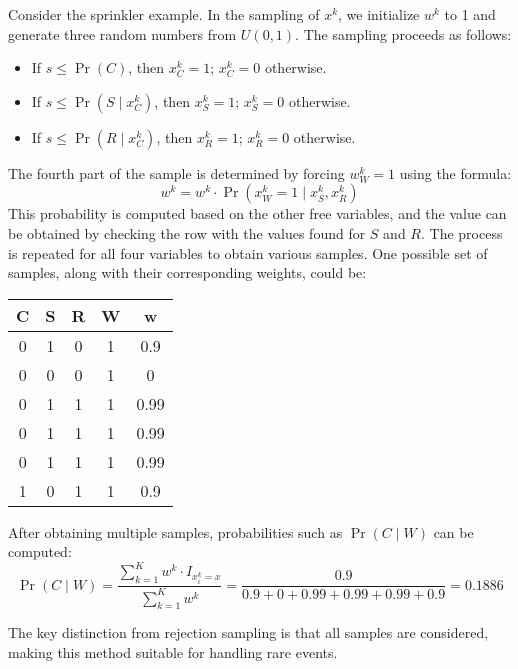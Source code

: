 \begin{example}
    Consider the sprinkler example. 
    In the sampling of $x^k$, we initialize $w^k$ to 1 and generate three random numbers from $U(0,1)$. 
    The sampling proceeds as follows:
    \begin{itemize}
        \item If $ s \leq \Pr(C)$, then $x_C^k=1$; $x_C^k=0$ otherwise. 
        \item If $ s \leq \Pr(S\mid x_C^k)$, then $x_S^k=1$; $x_S^k=0$ otherwise. 
        \item If $ s \leq \Pr(R\mid x_C^k)$, then $x_R^k=1$; $x_R^k=0$ otherwise. 
    \end{itemize}
    The fourth part of the sample is determined by forcing $w^k_W=1$ using the formula: 
    \[w^k=w^k\cdot\Pr\left( x_W^k=1\mid x_S^k,x_R^k \right)\]
    This probability is computed based on the other free variables, and the value can be obtained by checking the row with the values found for $S$ and $R$.
    The process is repeated for all four variables to obtain various samples. 
    One possible set of samples, along with their corresponding weights, could be:
    \begin{table}[H]
        \centering
        \begin{tabular}{ccccc}
        \hline
        \textbf{C} & \textbf{S} & \textbf{R} & \textbf{W} & \textbf{w}  \\ \hline
        0          & 1          & 0          & 1          & 0.9         \\
        0          & 0          & 0          & 1          & 0           \\
        0          & 1          & 1          & 1          & 0.99        \\
        0          & 1          & 1          & 1          & 0.99        \\
        0          & 1          & 1          & 1          & 0.99        \\
        1          & 0          & 1          & 1          & 0.9         \\ \hline
        \end{tabular}
    \end{table}
    After obtaining multiple samples, probabilities such as $\Pr(C\mid W)$ can be computed:
    \[\Pr(C\mid W)=\dfrac{\sum_{k=1}^Kw^k\cdot I_{x_i^k=x}}{\sum_{k=1}^Kw^k}=\dfrac{0.9}{0.9+0+0.99+0.99+0.99+0.9}=0.1886\]
\end{example}
The key distinction from rejection sampling is that all samples are considered, making this method suitable for handling rare events.

